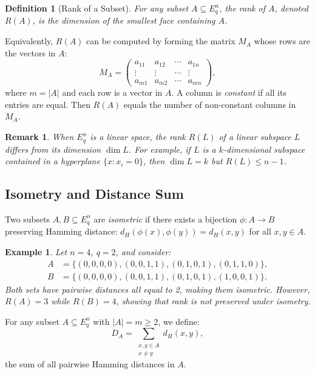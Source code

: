 \documentclass[12pt]{article}
\newtheorem{definition}[theorem]{Definition}
\newtheorem{example}[theorem]{Example}
\newtheorem{remark}[theorem]{Remark}
\newcommand{\Eqn}{E_q^n}
\renewcommand{\geq}{\geqslant}
\renewcommand{\leq}{\leqslant}
\begin{document}
\begin{definition}[Rank of a Subset]
\label{def:rank}
For any subset $A \subseteq \Eqn$, the \emph{rank} of $A$, denoted $R(A)$, is the dimension of the smallest face containing $A$.
\end{definition}

Equivalently, $R(A)$ can be computed by forming the matrix $M_A$ whose rows are the vectors in $A$:
\[
M_A = \begin{pmatrix}
a_{11} & a_{12} & \cdots & a_{1n} \\
\vdots & \vdots & \cdots & \vdots \\
a_{m1} & a_{m2} & \cdots & a_{mn}
\end{pmatrix},
\]
where $m = |A|$ and each row is a vector in $A$. A column is \emph{constant} if all its entries are equal. Then $R(A)$ equals the number of non-constant columns in $M_A$.

\begin{remark}
When $\Eqn$ is a linear space, the rank $R(L)$ of a linear subspace $L$ differs from its dimension $\dim L$. For example, if $L$ is a $k$-dimensional subspace contained in a hyperplane $\{x : x_i = 0\}$, then $\dim L = k$ but $R(L) \leq n-1$.
\end{remark}

\subsection{Isometry and Distance Sum}

Two subsets $A, B \subseteq \Eqn$ are \emph{isometric} if there exists a bijection $\phi: A \to B$ preserving Hamming distance: $d_H(\phi(x), \phi(y)) = d_H(x, y)$ for all $x, y \in A$.

\begin{example}
Let $n = 4$, $q = 2$, and consider:
\begin{align}
A &= \{(0,0,0,0), (0,0,1,1), (0,1,0,1), (0,1,1,0)\}, \\
B &= \{(0,0,0,0), (0,0,1,1), (0,1,0,1), (1,0,0,1)\}.
\end{align}
Both sets have pairwise distances all equal to 2, making them isometric. However, $R(A) = 3$ while $R(B) = 4$, showing that rank is not preserved under isometry.
\end{example}

For any subset $A \subseteq \Eqn$ with $|A| = m \geq 2$, we define:
\[
D_A = \sum_{\substack{x,y \in A \\ x \neq y}} d_H(x, y),
\]
the sum of all pairwise Hamming distances in $A$.
\end{document}
